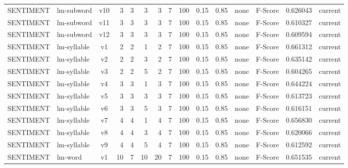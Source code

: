 \documentclass{article}
\begin{document}
\begin{xltabular}{\linewidth}{@{}lYcrrrrrrrrYlrl@{}}
SENTIMENT & lm-subword & v10 & 3 & 3 & 3 & 3 & 7 & 100 & 0.15 & 0.85 & none & F-Score & 0.626043 & current \\
SENTIMENT & lm-subword & v11 & 3 & 3 & 3 & 3 & 7 & 100 & 0.15 & 0.85 & none & F-Score & 0.610327 & current \\
SENTIMENT & lm-subword & v12 & 3 & 3 & 3 & 3 & 7 & 100 & 0.15 & 0.85 & none & F-Score & 0.609594 & current \\
SENTIMENT & lm-syllable & v1 & 2 & 2 & 1 & 2 & 7 & 100 & 0.15 & 0.85 & none & F-Score & 0.661312 & current \\
SENTIMENT & lm-syllable & v2 & 2 & 2 & 3 & 2 & 7 & 100 & 0.15 & 0.85 & none & F-Score & 0.635142 & current \\
SENTIMENT & lm-syllable & v3 & 2 & 2 & 5 & 2 & 7 & 100 & 0.15 & 0.85 & none & F-Score & 0.604265 & current \\
SENTIMENT & lm-syllable & v4 & 3 & 3 & 1 & 3 & 7 & 100 & 0.15 & 0.85 & none & F-Score & 0.644224 & current \\
SENTIMENT & lm-syllable & v5 & 3 & 3 & 3 & 3 & 7 & 100 & 0.15 & 0.85 & none & F-Score & 0.613723 & current \\
SENTIMENT & lm-syllable & v6 & 3 & 3 & 5 & 3 & 7 & 100 & 0.15 & 0.85 & none & F-Score & 0.616151 & current \\
SENTIMENT & lm-syllable & v7 & 4 & 4 & 1 & 4 & 7 & 100 & 0.15 & 0.85 & none & F-Score & 0.656830 & current \\
SENTIMENT & lm-syllable & v8 & 4 & 4 & 3 & 4 & 7 & 100 & 0.15 & 0.85 & none & F-Score & 0.620066 & current \\
SENTIMENT & lm-syllable & v9 & 4 & 4 & 5 & 4 & 7 & 100 & 0.15 & 0.85 & none & F-Score & 0.612592 & current \\
SENTIMENT & lm-word & v1 & 10 & 7 & 10 & 20 & 7 & 100 & 0.15 & 0.85 & none & F-Score & 0.651535 & current \\
\end{xltabular}
\end{document}
